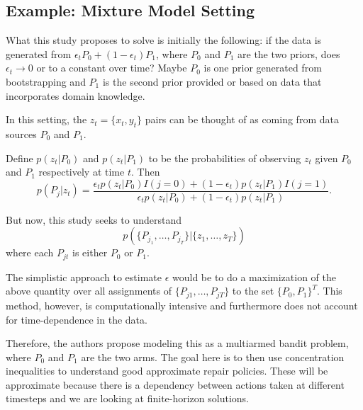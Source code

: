 \documentclass[english]{article}
\numberwithin{equation}{section}
\begin{document}
\subsection*{Example: Mixture Model Setting}
What this study proposes to solve is initially the following:
if the data is generated from $\epsilon_t P_0 + (1-\epsilon_t) P_1$, where $P_0$ and $P_1$ are the two priors, does $\epsilon_t\to 0$ or to a constant over time? Maybe $P_0$ is one prior generated from bootstrapping and $P_1$ is the second prior provided or based on data that incorporates domain knowledge.

In this setting, the $z_t=\{x_t,y_t\}$ pairs can be thought of as coming from data sources $P_0$ and $P_1$.

Define $p(z_t|P_0)$ and $p(z_t|P_1)$ to be the probabilities of observing $z_t$ given $P_0$ and $P_1$ respectively at time $t$. Then $$p(P_j|z_t)=\frac{\epsilon_t p(z_t|P_0) I(j=0) + (1-\epsilon_t) p(z_t|P_1) I(j=1)}{\epsilon_t p(z_t|P_0) + (1-\epsilon_t) p(z_t|P_1)}.$$

But now, this study seeks to understand
$$p(\{P_{j_1},\ldots,P_{j_T}\}|\{z_1,\ldots,z_T\})$$ where each $P_{jt}$ is either $P_0$ or $P_1$.

The simplistic approach to estimate $\epsilon$ would be to do a maximization of the above quantity over all assignments of $\{P_{j1},\ldots,P_{jT}\}$ to the set $\{P_0,P_1\}^T$. This method, however, is computationally intensive and furthermore does not account for time-dependence in the data.

Therefore, the authors propose modeling this as a multiarmed bandit problem, where $P_0$ and $P_1$ are the two arms. The goal here is to then use concentration inequalities to understand good approximate repair policies. These will be approximate because there is a dependency between actions taken at different timesteps and we are looking at finite-horizon solutions.
\end{document}

